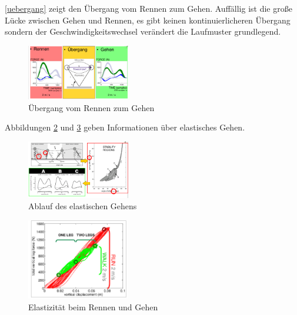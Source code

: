 \autoref{uebergang} zeigt den Übergang vom Rennen zum Gehen. Auffällig ist die große Lücke zwischen Gehen und Rennen, es gibt keinen kontinuierlicheren Übergang sondern der Geschwindigkeitswechsel verändert die Laufmuster grundlegend.
\begin{figure}[h!]
	\centering
	\includegraphics[width=0.4\textwidth]{figures/ch06_uebergang2.png}
	\caption{Übergang vom Rennen zum Gehen}
	\label{uebergang}
\end{figure}
Abbildungen \ref{eg} und \ref{erg} geben Informationen über elastisches Gehen.
\begin{figure}[h!]
	\centering
	\includegraphics[width=0.4\textwidth]{figures/ch06_gehen.png}
	\caption{Ablauf des elastischen Gehens}
	\label{eg}
\end{figure}
\begin{figure}[h!]
	\centering
	\includegraphics[width=0.4\textwidth]{figures/ch06_rennen-gehen.png}
	\caption{Elastizität beim Rennen und Gehen}
	\label{erg}
\end{figure}


